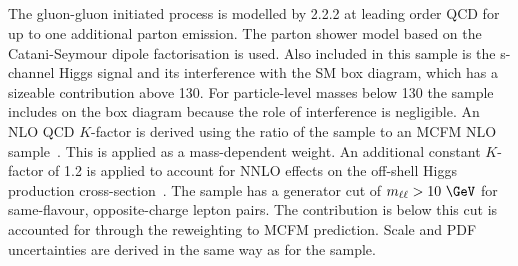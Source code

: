 \subsection{\ggFourL{}}
The gluon-gluon initiated \ggFourL{} process is modelled by \SHERPA{} 2.2.2 at leading order QCD for up to one additional parton emission. The \SHERPA parton shower model based on the Catani-Seymour dipole factorisation is used. Also included in this sample is the s-channel Higgs signal \ggS{} and its interference with the SM box diagram, which has a sizeable contribution above \unit{130}{\GeV}. For particle-level masses below \unit{130}{\GeV} the sample includes on the \ggFourL box diagram because the role of interference is negligible. An NLO QCD $K$-factor is derived using the ratio of the \SHERPA{} sample to an MCFM NLO sample~\cite{Campbell:2011bn}. This is applied as a mass-dependent weight.
An additional constant $K$-factor of 1.2 is applied to account for NNLO effects on the off-shell Higgs production cross-section~\cite{Passarino:2013bha,deFlorian:2016spz}. The sample has a generator cut of $\mll > 10~\GeV$ for same-flavour, opposite-charge lepton pairs. The contribution is below this cut is accounted for through the reweighting to MCFM prediction. Scale and PDF uncertainties are derived in the same way as for the \SHERPA{} \qqFourL{} sample.

